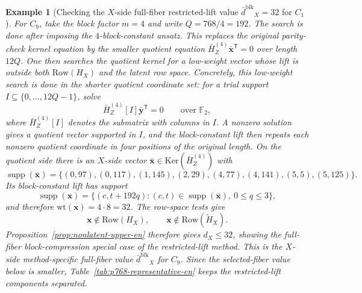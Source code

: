 \documentclass[11pt]{article}
\newcommand{\Ftwo}{\mathbb{F}_2}
\newcommand{\Ker}{\mathrm{Ker}}
\newcommand{\Row}{\mathrm{Row}}
\newcommand{\wt}{\mathrm{wt}}
\newcommand{\Htil}{\tilde{H}}
\newcommand{\dbound}[1]{\ensuremath{\bar{d}^{\mathrm{#1}}}}
\newcommand{\dblk}{\dbound{blk}}
\newcommand{\vect}[1]{\bm{#1}}
\newcommand{\vx}{\vect{x}}
\newcommand{\vy}{\vect{y}}
\theoremstyle{uprightthm}
\newtheorem{example}[theorem]{Example}
\begin{document}
\begin{example}[Checking the $X$-side full-fiber restricted-lift value \texorpdfstring{\(\dblk_X=32\)}{dbar-blk-X=32} for \(C_1\)]
For $C_9$, take the block factor $m=4$ and write $Q=768/4=192$.
The search is done after imposing the $4$-block-constant ansatz.  This replaces
the original parity-check kernel equation by the smaller quotient equation
$\bar H_Z^{(4)}\bar{\vx}^{\mathsf T}=0$ over length $12Q$.  One then searches
the quotient kernel for a low-weight vector whose lift is outside both
$\Row(H_X)$ and the latent row space.  Concretely, this low-weight search is
done in the shorter quotient coordinate set: for a trial support
$I\subseteq\{0,\ldots,12Q-1\}$, solve
\[
\bar H_Z^{(4)}[I]\bar{\vy}^{\mathsf T}=0
\qquad\text{over }\Ftwo,
\]
where $\bar H_Z^{(4)}[I]$ denotes the submatrix with columns in $I$.  A nonzero
solution gives a quotient vector supported in $I$, and the block-constant lift
then repeats each nonzero quotient coordinate in four positions of the original
length.  On the quotient side there is an
$X$-side vector
$\bar{\vx}\in\Ker(\bar H_Z^{(4)})$ with
\[
\operatorname{supp}(\bar{\vx})
=
\{(0,97),(0,117),(1,145),(2,29),(4,77),(4,141),(5,5),(5,125)\}.
\]
Its block-constant lift has support
\[
\operatorname{supp}(\vx)
=
\{(c,t+192q):(c,t)\in\operatorname{supp}(\bar{\vx}),\ 0\le q\le 3\},
\]
and therefore $\wt(\vx)=4\cdot 8=32$.
The row-space tests give
\[
\vx\notin\Row(H_X),
\qquad
\vx\notin\Row(\Htil_X).
\]
Proposition~\ref{prop:nonlatent-upper-en} therefore gives $d_X\le 32$,
showing the full-fiber block-compression special case of the restricted-lift
method.  This is the $X$-side method-specific full-fiber value $\dblk_X$ for
$C_9$.  Since the selected-fiber value below is smaller, Table~\ref{tab:p768-representative-en}
keeps the restricted-lift components separated.
\end{example}
\end{document}
